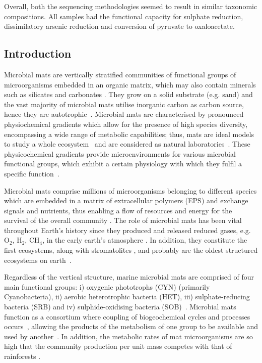    Overall, both the sequencing methodologies seemed to result in similar 
   taxonomic compositions. 
   All samples had the functional capacity for sulphate reduction, 
   dissimilatory arsenic reduction and conversion of pyruvate to oxaloacetate. 


\subsection{Introduction}
\label{swamp:intro}

   Microbial mats are vertically stratified communities of functional groups of microorganisms embedded in an organic matrix, 
   which may also contain minerals such as silicates and carbonates 
   \citep{stal_cyanobacterial_2012, bolhuis_molecular_2014, prieto-barajas_microbial_2018}. 
   They grow on a solid substrate (e.g. sand) and the vast majority of microbial mats utilise inorganic carbon as carbon source, 
   hence they are autotrophic~\citep{bolhuis_molecular_2014}. 
   Microbial mats are characterised by pronounced physiochemical gradients which allow for the presence of high species diversity, 
   encompassing a wide range of metabolic capabilities; 
   thus, mats are ideal models to study a whole ecosystem~\citep{al-thani_community_2014} and are considered as 
   natural laboratories~\citep{villanueva_analysis_2007}. 
   These physicochemical gradients provide microenvironments for various microbial functional groups, which exhibit 
   a certain physiology with which they fulfil a specific function~\citep{van_gemerden_microbial_1993}. 
   
   Microbial mats comprise millions of microorganisms belonging to different species which are embedded in a matrix of 
   extracellular polymers (EPS) and exchange signals and nutrients, 
   thus enabling a flow of resources and energy for the survival of the overall community 
   \citep{ruvindy_unravelling_2016, prieto-barajas_microbial_2018}. 
   The role of microbial mats has been vital throughout Earth's history since they produced and released reduced gases, 
   e.g. O$_2$, H$_2$, CH$_4$, in the early earth's atmosphere \citep{hoehler_role_2001}. 
   In addition, they constitute the first ecosystems, along with stromatolites 
   \citep{santoyo_unveiling_2021}, 
   and probably are the oldest structured ecosystems on earth~\citep{van_gemerden_microbial_1993}.

   Regardless of the vertical structure, marine microbial mats are comprised of four main functional groups: 
   i) oxygenic phototrophs (CYN) (primarily Cyanobacteria), 
   ii) aerobic heterotrophic bacteria (HET), 
   iii) sulphate-reducing bacteria (SRB) and 
   iv) sulphide-oxidising bacteria (SOB)~\citep{visscher_microbial_2005}. 
   Microbial mats function as a consortium where coupling of biogeochemical cycles and processes occurs~\citep{paerl_cyanobacterialbacterial_2000}, 
   allowing the products of the metabolism of one group to be available and used by another~\citep{santoyo_unveiling_2021}. 
   In addition, the metabolic rates of mat microorganisms are so high that the community production per unit mass competes with that of rainforests
   \citep{jorgensen_diffusion_1994, krumbein_fossil_2003}. 

